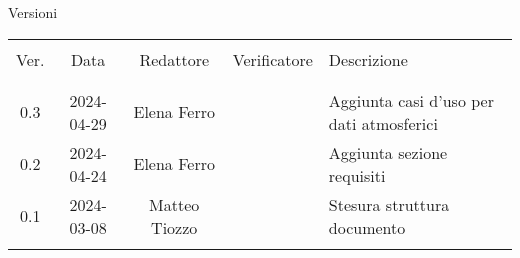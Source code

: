 \documentclass[italian,12pt]{article}
\begin{document}


\newpage



\captionsetup[table]{list=no}
\begin{table}[!h]
	\footnotesize
	\begin{center}
		Versioni\\
		\vspace{0.5cm}
		\begin{tabular}{ c c c c p{6.1cm} }
			\hline                                                                                      \\[-2ex]
			Ver. & Data       & Redattore     & Verificatore & Descrizione                              \\
			\\[-2ex] \hline \\[-1.5ex]
			0.3  & 2024-04-29 & Elena Ferro   &              & Aggiunta casi d'uso per dati atmosferici \\
			0.2  & 2024-04-24 & Elena Ferro   &              & Aggiunta sezione requisiti               \\
			0.1  & 2024-03-08 & Matteo Tiozzo &              & Stesura struttura documento              \\
			\\[-1.5ex] \hline
		\end{tabular}
	\end{center}
\end{table}
\captionsetup[table]{list=yes}

\newpage

\tableofcontents
\listoftables

\newpage








\end{document}
